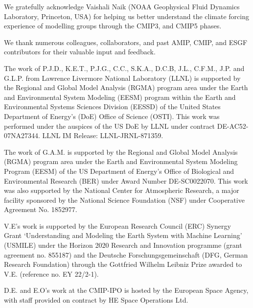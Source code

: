 \documentclass[manuscript]{copernicus}
\begin{document}
\begin{acknowledgements}
We gratefully acknowledge Vaishali Naik (NOAA Geophysical Fluid Dynamics Laboratory, Princeton, USA) for helping us better understand the climate forcing experience of modelling groups through the CMIP3, and CMIP5 phases.

We thank numerous colleagues, collaborators, and past AMIP, CMIP, and ESGF contributors for their valuable input and feedback.

The work of P.J.D., K.E.T., P.J.G., C.C., S.K.A., D.C.B, J.L., C.F.M., J.P. and G.L.P. from Lawrence Livermore National Laboratory (LLNL) is supported by the Regional and Global Model Analysis (RGMA) program area under the Earth and Environmental System Modeling (EESM) program within the Earth and Environmental Systems Sciences Division (EESSD) of the United States Department of Energy’s (DoE) Office of Science (OSTI). This work was performed under the auspices of the US DoE by LLNL under contract DE-AC52-07NA27344. LLNL IM Release: LLNL-JRNL-871359.

The work of G.A.M. is supported by the Regional and Global Model Analysis (RGMA) program area under the Earth and Environmental System Modeling Program (EESM) of the US Department of Energy's Office of Biological and Environmental Research (BER) under Award Number DE-SC0022070. This work was also supported by the National Center for Atmospheric Research, a major facility sponsored by the National Science Foundation (NSF) under Cooperative Agreement No. 1852977.

V.E’s work is supported by the European Research Council (ERC) Synergy Grant ‘Understanding and Modeling the Earth System with Machine Learning’ (USMILE) under the Horizon 2020 Research and Innovation programme (grant agreement no. 855187) and the Deutsche Forschungsgemeinschaft (DFG, German Research Foundation) through the Gottfried Wilhelm Leibniz Prize awarded to V.E. (reference no. EY 22/2-1).

D.E. and E.O's work at the CMIP-IPO is hosted by the European Space Agency, with staff provided on contract by HE Space Operations Ltd.

\end{acknowledgements}






\end{document}
